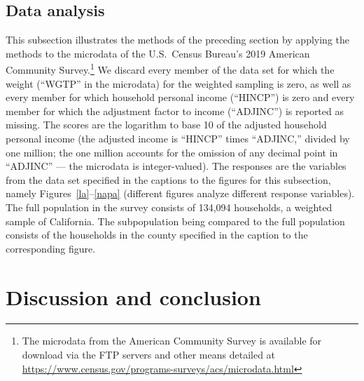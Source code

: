 \documentclass[12pt]{article}
\begin{document}
\subsection{Data analysis}
\label{analysis}

This subsection illustrates the methods of the preceding section
by applying the methods to the microdata of the U.S.\ Census Bureau's
2019 American Community Survey.\footnote{The microdata
from the American Community Survey is available for download
via the FTP servers and other means detailed
at \url{https://www.census.gov/programs-surveys/acs/microdata.html}}
We discard every member of the data set for which the weight
(``WGTP'' in the microdata) for the weighted sampling is zero,
as well as every member for which household personal income (``HINCP'') is zero
and every member for which the adjustment factor to income (``ADJINC'')
is reported as missing.
The scores are the logarithm to base 10
of the adjusted household personal income
(the adjusted income is ``HINCP'' times ``ADJINC,'' divided by one million;
the one million accounts for the omission of any decimal point in ``ADJINC''
--- the microdata is integer-valued).
The responses are the variables from the data set specified
in the captions to the figures for this subsection,
namely Figures~\ref{la}--\ref{napa}
(different figures analyze different response variables).
The full population in the survey consists of 134,094 households,
a weighted sample of California.
The subpopulation being compared to the full population
consists of the households in the county specified in the caption
to the corresponding figure.



\section{Discussion and conclusion}
\label{conclusion}
\end{document}
